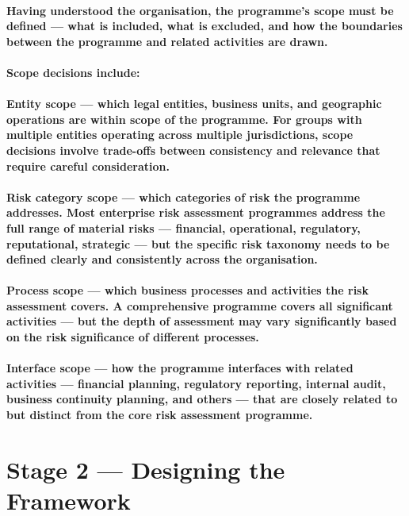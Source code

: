 \paragraph{Having understood the organisation, the programme's scope must be defined — what is included, what is excluded, and how the boundaries between the programme and related activities are drawn.}
\paragraph{Scope decisions include:}
\paragraph{\textbf{Entity scope} — which legal entities, business units, and geographic operations are within scope of the programme. For groups with multiple entities operating across multiple jurisdictions, scope decisions involve trade-offs between consistency and relevance that require careful consideration.}
\paragraph{\textbf{Risk category scope} — which categories of risk the programme addresses. Most enterprise risk assessment programmes address the full range of material risks — financial, operational, regulatory, reputational, strategic — but the specific risk taxonomy needs to be defined clearly and consistently across the organisation.}
\paragraph{\textbf{Process scope} — which business processes and activities the risk assessment covers. A comprehensive programme covers all significant activities — but the depth of assessment may vary significantly based on the risk significance of different processes.}
\paragraph{\textbf{Interface scope} — how the programme interfaces with related activities — financial planning, regulatory reporting, internal audit, business continuity planning, and others — that are closely related to but distinct from the core risk assessment programme.}

\section{Stage 2 — Designing the Framework}

